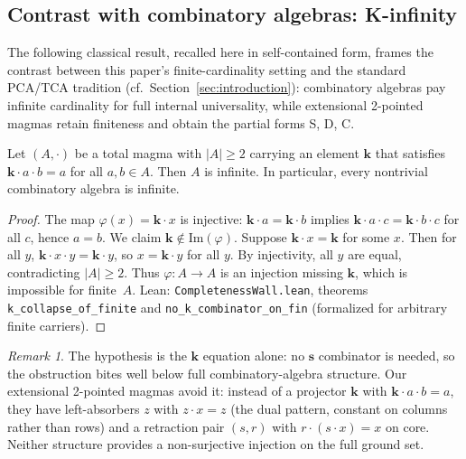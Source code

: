 \documentclass[sigconf,screen]{acmart}
\newcommand{\dotop}{\cdot}
\theoremstyle{remark}
\newtheorem{remark}{Remark}
\begin{document}
\subsection{Contrast with combinatory algebras: K-infinity}

The following classical result, recalled here in self-contained form, frames the contrast between this paper's finite-cardinality setting and the standard PCA/TCA tradition (cf.~Section~\ref{sec:introduction}): combinatory algebras pay infinite cardinality for full internal universality, while extensional 2-pointed magmas retain finiteness and obtain the partial forms S, D, C.

\begin{theorem}[K-infinity]
\label{thm:k-infinity}
Let $(A, \dotop)$ be a total magma with $|A| \geq 2$ carrying an element $\mathbf{k}$ that satisfies $\mathbf{k} \dotop a \dotop b = a$ for all $a, b \in A$. Then $A$ is infinite. In particular, every nontrivial combinatory algebra is infinite.
\end{theorem}

\begin{proof}
The map $\varphi(x) = \mathbf{k} \dotop x$ is injective: $\mathbf{k} \dotop a = \mathbf{k} \dotop b$ implies $\mathbf{k} \dotop a \dotop c = \mathbf{k} \dotop b \dotop c$ for all $c$, hence $a = b$. We claim $\mathbf{k} \notin \mathrm{Im}(\varphi)$. Suppose $\mathbf{k} \dotop x = \mathbf{k}$ for some $x$. Then for all $y$, $\mathbf{k} \dotop x \dotop y = \mathbf{k} \dotop y$, so $x = \mathbf{k} \dotop y$ for all $y$. By injectivity, all $y$ are equal, contradicting $|A| \geq 2$. Thus $\varphi : A \to A$ is an injection missing $\mathbf{k}$, which is impossible for finite~$A$. Lean: \texttt{CompletenessWall.lean}, theorems \texttt{k\_collapse\_of\_finite} and \texttt{no\_k\_combinator\_on\_fin} (formalized for arbitrary finite carriers).
\end{proof}

\begin{remark}
The hypothesis is the $\mathbf{k}$ equation alone: no $\mathbf{s}$ combinator is needed, so the obstruction bites well below full combinatory-algebra structure. Our extensional 2-pointed magmas avoid it: instead of a projector $\mathbf{k}$ with $\mathbf{k} \dotop a \dotop b = a$, they have left-absorbers $z$ with $z \dotop x = z$ (the dual pattern, constant on columns rather than rows) and a retraction pair $(s, r)$ with $r \dotop (s \dotop x) = x$ on core. Neither structure provides a non-surjective injection on the full ground set.
\end{remark}
\end{document}
